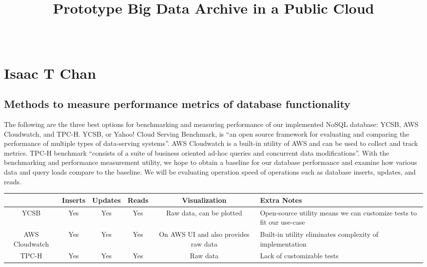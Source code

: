 \documentclass[10pt,draftclsnofoot,onecolumn,journal,compsoc]{IEEEtran}
\title{Prototype Big Data Archive in a Public Cloud}
\author{
  \IEEEauthorblockN{Group 56: Pathfinder of Big Data\\Zhi Jiang, Isaac T Chan, Zhaoheng Wang} \\
  \IEEEauthorblockA{CS 461: Senior Capstone Fall 2016 \\ Oregon State University}
}
\date{}
\begin{document}
    \maketitle
    \IEEEdisplaynontitleabstractindextext
    \IEEEpeerreviewmaketitle

    \newpage
    \tableofcontents
    \newpage
    \section{Isaac T Chan}
        \subsection{Methods to measure performance metrics of database functionality}
        The following are the three best options for benchmarking and measuring performance of our implemented NoSQL database: YCSB, AWS Cloudwatch, and TPC-H. YCSB, or Yahoo! Cloud Serving Benchmark, is “an open source framework for evaluating and comparing the performance of multiple types of data-serving systems”\cite{I1}. AWS Cloudwatch is a built-in utility of AWS and can be used to collect and track metrics. TPC-H benchmark “consists of a suite of business oriented ad-hoc queries and concurrent data modifications”\cite{I2}. With the benchmarking and performance measurement utility, we hope to obtain a baseline for our database performance and examine how various data and query loads compare to the baseline. We will be evaluating operation speed of operations such as database inserts, updates, and reads.
        
        \begin{table}[ht]
        \begin{tabular}{|c|c|c|c|c|p{5cm}|}
            \hline
            \textbf{} & \textbf{Inserts} & \textbf{Updates} & \textbf{Reads} & \textbf{Visualization} & \textbf{Extra Notes}\\
            \hline
            YCSB & Yes & Yes & Yes & Raw data, can be plotted & Open-source utility means we can customize tests to fit our use-case\\
            \hline
            AWS Cloudwatch & Yes & Yes & Yes & On AWS UI and also provides raw data & Built-in utility eliminates complexity of implementation\\
            \hline
            TPC-H & Yes & Yes & Yes & Raw data &Lack of customizable tests\\
            \hline
        \end{tabular}
        \end{table}
       
\end{document}
